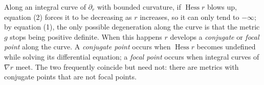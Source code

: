 \begin{definition}
  \label{def:pet-ch3-conjugate-focal-point}
  \leanok
  Along an integral curve of $\partial_r$ with bounded curvature, if
  $\operatorname{Hess}r$ blows up, equation (2) forces it to be decreasing as $r$
  increases, so it can only tend to $-\infty$; by equation (1), the only possible
  degeneration along the curve is that the metric $g$ stops being positive
  definite. When this happens $r$ develops a \emph{conjugate} or \emph{focal
  point} along the curve. A \emph{conjugate point} occurs when
  $\operatorname{Hess}r$ becomes undefined while solving its differential
  equation; a \emph{focal point} occurs when integral curves of $\nabla r$ meet.
  The two frequently coincide but need not: there are metrics with conjugate
  points that are not focal points.
\end{definition}

